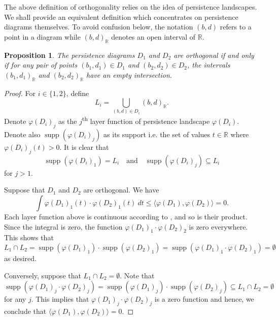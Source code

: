 \documentclass[sn-mathphys-num]{sn-jnl}%
\theoremstyle{thmstyleone}%
\newtheorem{proposition}[theorem]{Proposition}%
\theoremstyle{thmstyletwo}%
\theoremstyle{thmstylethree}%
\begin{document}
The above definition of orthogonality relies on the idea of persistence landscapes. We shall provide an equivalent definition which concentrates on persistence diagrams themselves. To avoid confusion below, the notation $(b,d)$ refers to a point in a diagram while $\left(b,d\right)_{\mathbb{R}}$ denotes an open interval of $\mathbb{R}$.

\begin{proposition}\label{proposition: orthogonal no intersection}
	The persistence diagrams $D_1$ and $D_2$ are orthogonal if and only if for any pair of points $(b_1, d_1) \in D_1$ and $(b_2, d_2) \in D_2$, the intervals $\left(b_1, d_1\right)_{\mathbb{R}}$ and $\left(b_2, d_2\right)_{\mathbb{R}}$ have an empty intersection.
\end{proposition}
\begin{proof}
	For $i \in\{1,2\}$, define
	\begin{equation*}
		L_i=\bigcup_{(b, d) \in D_i}\left(b, d\right)_{\mathbb{R}}.
	\end{equation*}
	Denote $\varphi(D_i)_j$ as the $j$\textsuperscript{th} layer function of persistence landscape $\varphi(D_i)$. Denote also $\operatorname{supp}\left(\varphi(D_i)_j\right)$ as its support i.e. the set of values $t \in \mathbb{R}$ where $\varphi(D_i)_j(t)>0$. It is clear that
	\begin{equation*}
		\operatorname{supp}\left(\varphi(D_i)_1\right)=L_i \quad \textrm{and} \quad \operatorname{supp}\left(\varphi(D_i)_j\right) \subseteq L_i
	\end{equation*}	
	for $j>1$.
	
	Suppose that $D_1$ and $D_2$ are orthogonal. We have
	\begin{equation*}
		\int \varphi(D_1)_1(t) \cdot \varphi(D_2)_1(t) \ dt \leq\langle\varphi\left(D_1\right), \varphi\left(D_2\right)\rangle=0.
	\end{equation*}
	Each layer function above is continuous according to \cite{Bubenik_1}, and so is their product. Since the integral is zero, the function $\varphi(D_1)_1 \cdot \varphi(D_2)_2$ is zero everywhere. This shows that
	\begin{equation*}
		L_1 \cap L_2=\operatorname{supp}\left(\varphi(D_1)_1\right) \cdot \operatorname{supp}\left(\varphi(D_2)_1\right)=\operatorname{supp}\left(\varphi(D_1)_1 \cdot \varphi(D_2)_1\right)=\emptyset
	\end{equation*}
	as desired.
	
	Conversely, suppose that $L_1 \cap L_2=\emptyset$. Note that
	\begin{equation*}
		\operatorname{supp}\left(\varphi(D_1)_j \cdot \varphi(D_2)_j\right)=\operatorname{supp}\left(\varphi(D_1)_j\right) \cdot \operatorname{supp}\left(\varphi(D_2)_j\right) \subseteq L_1 \cap L_2=\emptyset
	\end{equation*}
	for any $j$. This implies that $\varphi(D_1)_j \cdot \varphi(D_2)_j$ is a zero function and hence, we conclude that $\langle\varphi(D_1), \varphi(D_2)\rangle=0$.
\end{proof}
\end{document}
